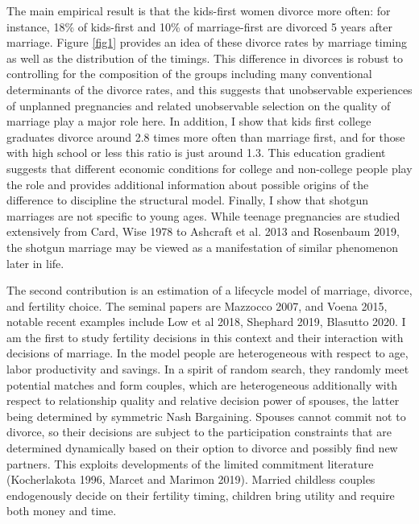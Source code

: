 \documentclass[12pt,letter]{article}
\begin{document}
The main empirical result is that the kids-first women divorce more often: for instance, 18\% of kids-first and 10\% of marriage-first are divorced 5 years after marriage. Figure \ref{fig1} provides an idea of these divorce rates by marriage timing as well as the distribution of the timings. This difference in divorces is robust to controlling for the composition of the groups including many conventional determinants of the divorce rates, and this suggests that unobservable experiences of unplanned pregnancies and related unobservable selection on the quality of marriage play a major role here. In addition, I show that kids first college graduates divorce around 2.8 times more often than marriage first, and for those with high school or less this ratio is just around 1.3. This education gradient suggests that different economic conditions for college and non-college people play the role and provides additional information about possible origins of the difference to discipline the structural model. Finally, I show that shotgun marriages are not specific to young ages. While teenage pregnancies are studied extensively from Card, Wise 1978 to Ashcraft et al. 2013 and Rosenbaum 2019, the shotgun marriage may be viewed as a manifestation of similar phenomenon later in life.

The second contribution is an estimation of a lifecycle model of marriage, divorce, and fertility choice. The seminal papers are Mazzocco 2007, and Voena 2015, notable recent examples include Low et al 2018, Shephard 2019, Blasutto 2020. I am the first to study fertility decisions in this context and their interaction with decisions of marriage. In the model people are heterogeneous with respect to age, labor productivity and savings. In a spirit of random search, they randomly meet potential matches and form couples, which are heterogeneous additionally with respect to relationship quality and relative decision power of spouses, the latter being determined by symmetric Nash Bargaining.  Spouses cannot commit not to divorce, so their decisions are subject to the participation constraints that are determined dynamically based on their option to divorce and possibly find new partners. This exploits developments of the limited commitment literature (Kocherlakota 1996, Marcet and Marimon 2019). Married childless couples endogenously decide on their fertility timing, children bring utility and require both money and time.
\end{document}
